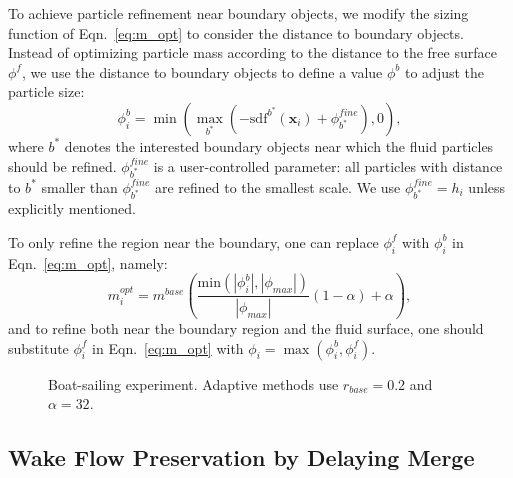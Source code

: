\documentclass[VANCOUVER,STIX1COL]{WileyNJD-v2}
\begin{document}
To achieve particle refinement near boundary objects, we modify the sizing function of Eqn.~\ref{eq:m_opt} to consider the distance to boundary objects. Instead of optimizing particle mass according to the distance to the free surface $\phi^f$, we use the distance to boundary objects to define a value $\phi^b$ to adjust the particle size:
\begin{equation}
    \phi_i^b = \min\left(\max_{b^*}\left(-\mathrm{sdf}^{b^*}(\mathbf{x}_i) + \phi_{b^*}^{fine}\right), 0\right),
    \label{eq:bound_distance}
\end{equation}
where $b^*$ denotes the interested boundary objects near which the fluid particles should be refined. $\phi_{b^*}^{fine}$ is a user-controlled parameter: all particles with distance to $b^*$ smaller than $\phi_{b^*}^{fine}$ are refined to the smallest scale. We use $\phi_{b^*}^{fine} = h_i$ unless explicitly mentioned.

To only refine the region near the boundary, one can replace $\phi_i^f$ with $\phi_i^b$ in Eqn.~\ref{eq:m_opt}, namely:
\begin{equation}
    m_i^{opt} = m^{base}\left(
    \frac{\mathrm{min}(|\phi_i^b|,|\phi_{max}|)}{|\phi_{max}|}
    (1 - \alpha) + \alpha
    \right),
    \label{eq:refine_bound}
\end{equation}
and to refine both near the boundary region and the fluid surface, one should substitute $\phi_i^f$ in Eqn.~\ref{eq:m_opt} with $\phi_i = \max(\phi_i^b, \phi_i^f)$.

\begin{figure}[htpb]
    \centering
    \vspace{-0.7\baselineskip}
    \caption{Boat-sailing experiment. Adaptive methods use $r_{base} = 0.2$ and $\alpha = 32$.}
    \label{fig:ship}
\end{figure}

\subsection{Wake Flow Preservation by Delaying Merge}
\label{sec:wake_flow}
\end{document}
